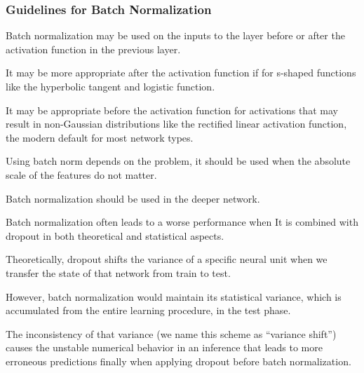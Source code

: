 	\subsubsection{Guidelines for Batch Normalization}
	\begin{bulletedlist}
		\item Batch normalization may be used on the inputs to the layer before or after the activation function in the previous layer.
		\item It may be more appropriate after the activation function if for s-shaped functions like the hyperbolic tangent and logistic function.
		\item It may be appropriate before the activation function for activations that may result in non-Gaussian distributions like the rectified linear activation function, the modern default for most network types.
		\item Using batch norm depends on the problem, it should be used when the absolute scale of the features do not matter.
		\item Batch normalization should be used in the deeper network.
		\item Batch normalization often leads to a worse performance when It is combined with drop\-out in both theoretical and statistical aspects.
		\item Theoretically, dropout shifts the variance of a specific neural unit when we transfer the state of that network from train to test.
		\item However, batch normalization would maintain its statistical variance, which is accumulated from the entire learning procedure, in the test phase.
		\item The inconsistency of that variance (we name this scheme as ``variance shift'') causes the unstable numerical behavior in an inference that leads to more erroneous predictions finally when applying dropout before batch normalization.
	\end{bulletedlist}

